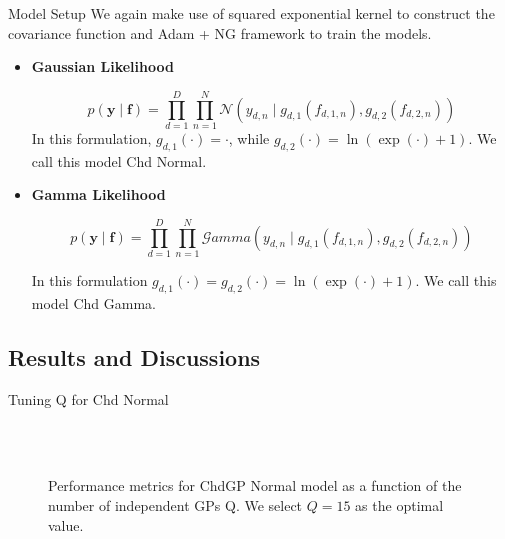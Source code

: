 \begin{frame}{Model Setup}
	We again make use of squared exponential kernel to construct the covariance function and Adam + NG framework to train the models.
	
	\begin{itemize} 
	
	\item \textbf{Gaussian Likelihood}
	
	\begin{equation*}
		p(\mathbf{y} \mid \mathbf{f}) = \prod_{d=1}^{D} \prod_{n=1}^{N} \mathcal{N}\left(y_{d,n} \mid g_{d,1}(f_{d,1,n}), g_{d,2}(f_{d,2,n}) \right)
	\end{equation*}
	In this formulation, \(g_{d,1}(\cdot) = \cdot\), while \(g_{d,2}(\cdot) = \ln(\exp(\cdot) + 1)\). We call this model Chd Normal.
	
	\item \textbf{Gamma Likelihood}
	
	\begin{equation*}
		p(\mathbf{y} \mid \mathbf{f}) = \prod_{d=1}^{D} \prod_{n=1}^{N} \mathcal{G}amma\left( y_{d,n} \mid g_{d,1}(f_{d,1,n}), g_{d,2}(f_{d,2,n}) \right)
	\end{equation*}
	
	In this formulation \(g_{d,1}(\cdot) = g_{d,2}(\cdot) = \ln(\exp(\cdot) + 1)\). We call this model Chd Gamma.
	\end{itemize}
	
		
\end{frame}

\subsection{Results and Discussions}

\begin{frame}{Tuning Q for Chd Normal}
	\begin{figure}[htbp]
		\centering
		\setlength{} 
		\setlength{}
		\subfloat[CRPS]{}
		\subfloat[MSE]{}\\
		\vspace{-0.2cm}
		\subfloat[MSLL]{}
		\subfloat[NLPD]{}\\
		\vspace{-0.5cm}
		\caption{Performance metrics for ChdGP Normal model as a function of the number of independent GPs Q. We select $Q = 15$ as the optimal value.}
	\end{figure}
\end{frame}

